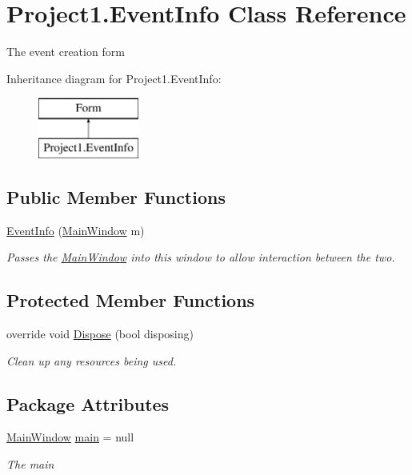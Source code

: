 \hypertarget{classProject1_1_1EventInfo}{}\section{Project1.\+Event\+Info Class Reference}
\label{classProject1_1_1EventInfo}


The event creation form  


Inheritance diagram for Project1.\+Event\+Info\+:\begin{figure}[H]
\begin{center}
\leavevmode
\includegraphics[height=2.000000cm]{classProject1_1_1EventInfo}
\end{center}
\end{figure}
\subsection*{Public Member Functions}
\begin{DoxyCompactItemize}
\item 
\hyperlink{classProject1_1_1EventInfo_a9bf24095fee3d3b879e61fa990e8209c}{Event\+Info} (\hyperlink{classProject1_1_1MainWindow}{Main\+Window} m)
\begin{DoxyCompactList}\small\item\em Passes the \hyperlink{classProject1_1_1MainWindow}{Main\+Window} into this window to allow interaction between the two. \end{DoxyCompactList}\end{DoxyCompactItemize}
\subsection*{Protected Member Functions}
\begin{DoxyCompactItemize}
\item 
override void \hyperlink{classProject1_1_1EventInfo_aa54f1ee810e1b9ea20b3bb9ed76be80b}{Dispose} (bool disposing)
\begin{DoxyCompactList}\small\item\em Clean up any resources being used. \end{DoxyCompactList}\end{DoxyCompactItemize}
\subsection*{Package Attributes}
\begin{DoxyCompactItemize}
\item 
\hyperlink{classProject1_1_1MainWindow}{Main\+Window} \hyperlink{classProject1_1_1EventInfo_ab2930e440128bf910d922e7615676d0d}{main} = null
\begin{DoxyCompactList}\small\item\em The main \end{DoxyCompactList}\end{DoxyCompactItemize}
